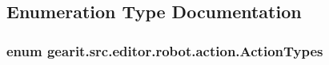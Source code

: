 \subsection{Enumeration Type Documentation}
\hypertarget{namespacegearit_1_1src_1_1editor_1_1robot_1_1action_a4be0fd46e3952d6135136b20e7b3fc5e}{
\subsubsection[{Action\+Types}]{\setlength{\rightskip}{0pt plus 5cm}enum {\bf gearit.\+src.\+editor.\+robot.\+action.\+Action\+Types}}}\label{namespacegearit_1_1src_1_1editor_1_1robot_1_1action_a4be0fd46e3952d6135136b20e7b3fc5e}
